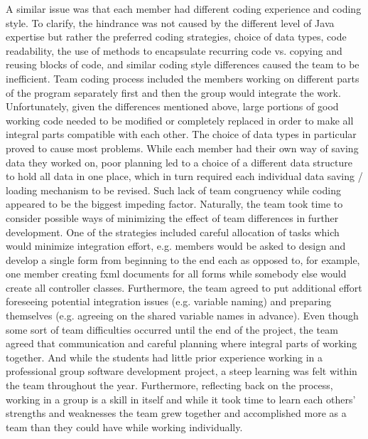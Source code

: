 \documentclass{l3proj}
\begin{document}
A similar issue was that each member had different coding experience and coding style. To clarify, the hindrance was not caused by the different level of Java expertise but rather the preferred coding strategies, choice of data types, code readability, the use of methods to encapsulate recurring code vs. copying and reusing blocks of code, and similar coding style differences caused the team to be inefficient. Team coding process included the members working on different parts of the program separately first and then the group would integrate the work. Unfortunately, given the differences mentioned above, large portions of good working code needed to be modified or completely replaced in order to make all integral parts compatible with each other. The choice of data types in particular proved to cause most problems. While each member had their own way of saving data they worked on, poor planning led to a choice of a different data structure to hold all data in one place, which in turn required each individual data saving / loading mechanism to be revised. Such lack of team congruency while coding appeared to be the biggest impeding factor.
Naturally, the team took time to consider possible ways of minimizing the effect of team differences in further development. One of the strategies included careful allocation of tasks which would minimize integration effort, e.g. members would be asked to design and develop a single form from beginning to the end each as opposed to, for example, one member creating fxml documents for all forms while somebody else would create all controller classes. Furthermore, the team agreed to put additional effort foreseeing potential integration issues (e.g. variable naming) and preparing themselves (e.g. agreeing on the shared variable names in advance).
Even though some sort of team difficulties occurred until the end of the project, the team agreed that communication and careful planning where integral parts of working together. And while the students had little prior experience working in a professional group software development project, a steep learning was felt within the team throughout the year. Furthermore, reflecting back on the process, working in a group is a skill in itself and while it took time to learn each others’ strengths and weaknesses the team grew together and accomplished more as a team than they could have while working individually.
\end{document}
